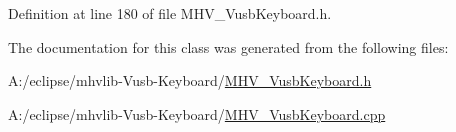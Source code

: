 \-Definition at line 180 of file \-M\-H\-V\-\_\-\-Vusb\-Keyboard.\-h.



\-The documentation for this class was generated from the following files\-:\begin{DoxyCompactItemize}
\item 
\-A\-:/eclipse/mhvlib-\/\-Vusb-\/\-Keyboard/\hyperlink{_m_h_v___vusb_keyboard_8h}{\-M\-H\-V\-\_\-\-Vusb\-Keyboard.\-h}\item 
\-A\-:/eclipse/mhvlib-\/\-Vusb-\/\-Keyboard/\hyperlink{_m_h_v___vusb_keyboard_8cpp}{\-M\-H\-V\-\_\-\-Vusb\-Keyboard.\-cpp}\end{DoxyCompactItemize}
